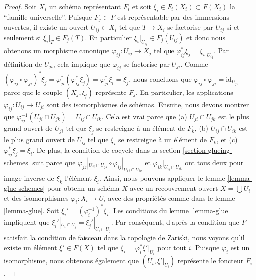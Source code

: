 \begin{proof}
Soit $X_i$ un schéma représentant $F_i$ et soit $\xi_i
\in F_i(X_i) \subset F(X_i)$ la ``famille universelle''. Puisque $F_j
\subset F$ est représentable par des immersions ouvertes, il
existe un ouvert $U_{ij} \subset X_i$ tel que $T \to X_i$
se factorise par $U_{ij}$ si et seulement si $\xi_i|_T
\in F_j(T)$. En particulier $\xi_i|_{U_{ij}}
\in F_j(U_{ij})$ et donc nous obtenons un morphisme canonique
$\varphi_{ij} : U_{ij} \to X_j$ tel que $\varphi_{ij}^*\xi_j =
\xi_i|_{U_{ij}}$. Par définition de $U_{ji}$, cela implique que $\varphi_{ij}$
se factorise par $U_{ji}$. Comme $(\varphi_{ij} \circ
\varphi_{ji})^*\xi_j =\varphi_{ji}^*(\varphi_{ij}^*\xi_j)
= \varphi_{ji}^*\xi_i = \xi_j$, nous
concluons que $\varphi_{ij} \circ \varphi_{ji} =
\text{id}_{U_{ji}}$ parce que le couple $(X_j, \xi_j)$ représente
$F_j$. En particulier, les applications $\varphi_{ij}
: U_{ij} \to U_{ji}$ sont des isomorphismes de schémas.
Ensuite, nous devons montrer que
$\varphi_{ij}^{-1}(U_{ji}
\cap U_{jk}) = U_{ij} \cap U_{ik}$. Cela est vrai parce que (a)
$U_{ji} \cap U_{jk}$ est le plus grand ouvert de $U_{ji}$ tel que
$\xi_j$ se restreigne à un élément de $F_k$, (b) $U_{ij} \cap U_{ik}$
est le plus grand ouvert de $U_{ij}$ tel que $\xi_i$
se restreigne à un élément de $F_k$, et (c) $\varphi_{ij}^*\xi_j
= \xi_i$. De plus, la condition de cocycle dans la section
\ref{section-glueing-schemes} suit parce que $\varphi_{jk}|_{U_{ji}
\cap U_{jk}} \circ
\varphi_{ij}|_{U_{ij} \cap U_{ik}}$ et
$\varphi_{ik}|_{U_{ij} \cap U_{ik}}$ ont tous deux
pour image inverse de $\xi_k$ l'élément $\xi_i$. Ainsi,
nous pouvons appliquer le
lemme \ref{lemma-glue-schemes} pour obtenir un schéma
$X$ avec un recouvrement ouvert $X =
\bigcup U_i$ et des isomorphismes $\varphi_i : X_i \to U_i$ avec des propriétés
comme dans le lemme \ref{lemma-glue}. Soit
$\xi_i' = (\varphi_i^{-1})^* \xi_i$. Les conditions
du lemme \ref{lemma-glue} impliquent que $\xi_i'|_{U_i
\cap U_j} = \xi_j'|_{U_i \cap U_j}$. Par conséquent,
d'après la condition que $F$ satisfait la condition de
faisceau dans la topologie de Zariski, nous voyons
qu'il existe un élément $\xi' \in F(X)$ tel que $\xi_i
= \varphi_i^*\xi'|_{U_i}$ pour tout $i$. Puisque
$\varphi_i$ est un isomorphisme, nous obtenons également
que $(U_i, \xi'|_{U_i})$ représente le foncteur $F_i$.


\end{proof}
